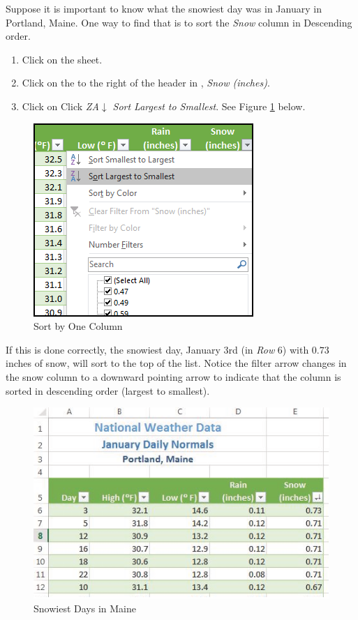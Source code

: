 Suppose it is important to know what the snowiest day was in January in Portland, Maine. One way to find that is to sort the \textit{Snow} column in Descending order.

\begin{enumerate}
	\item Click on the  sheet.
	\item Click on the  to the right of the header in , \textit{Snow (inches)}.
	\item Click on Click \textit{ZA$ \downarrow $ Sort Largest to Smallest}. See Figure \ref{05:fig08} below.
\end{enumerate}

\begin{figure}[H]
	\centering
	\includegraphics[width=\maxwidth{.65\linewidth}]{gfx/ch05_fig08}
	\caption{Sort by One Column}
	\label{05:fig08}
\end{figure}

If this is done correctly, the snowiest day, January 3rd (in \textit{Row} $ 6 $) with $ 0.73 $ inches of snow, will sort to the top of the list. Notice the filter arrow changes in the snow column to a downward pointing arrow to indicate that the column is sorted in descending order (largest to smallest).

\begin{figure}[H]
	\centering
	\includegraphics[width=\maxwidth{.95\linewidth}]{gfx/ch05_fig09}
	\caption{Snowiest Days in Maine}
	\label{05:fig09}
\end{figure}

